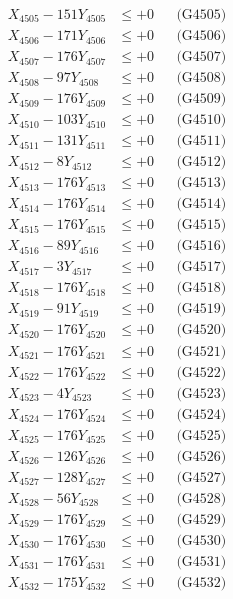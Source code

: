 \documentclass[a4paper,10pt]{article}
\begin{document}
{\begin{align}
X_{4505} - 151Y_{4505} &\leq +0 && \text{(G4505)} \\
X_{4506} - 171Y_{4506} &\leq +0 && \text{(G4506)} \\
X_{4507} - 176Y_{4507} &\leq +0 && \text{(G4507)} \\
X_{4508} - 97Y_{4508} &\leq +0 && \text{(G4508)} \\
X_{4509} - 176Y_{4509} &\leq +0 && \text{(G4509)} \\
X_{4510} - 103Y_{4510} &\leq +0 && \text{(G4510)} \\
\allowbreak
X_{4511} - 131Y_{4511} &\leq +0 && \text{(G4511)} \\
X_{4512} - 8Y_{4512} &\leq +0 && \text{(G4512)} \\
X_{4513} - 176Y_{4513} &\leq +0 && \text{(G4513)} \\
X_{4514} - 176Y_{4514} &\leq +0 && \text{(G4514)} \\
X_{4515} - 176Y_{4515} &\leq +0 && \text{(G4515)} \\
X_{4516} - 89Y_{4516} &\leq +0 && \text{(G4516)} \\
X_{4517} - 3Y_{4517} &\leq +0 && \text{(G4517)} \\
X_{4518} - 176Y_{4518} &\leq +0 && \text{(G4518)} \\
X_{4519} - 91Y_{4519} &\leq +0 && \text{(G4519)} \\
X_{4520} - 176Y_{4520} &\leq +0 && \text{(G4520)} \\
\allowbreak
X_{4521} - 176Y_{4521} &\leq +0 && \text{(G4521)} \\
X_{4522} - 176Y_{4522} &\leq +0 && \text{(G4522)} \\
X_{4523} - 4Y_{4523} &\leq +0 && \text{(G4523)} \\
X_{4524} - 176Y_{4524} &\leq +0 && \text{(G4524)} \\
X_{4525} - 176Y_{4525} &\leq +0 && \text{(G4525)} \\
X_{4526} - 126Y_{4526} &\leq +0 && \text{(G4526)} \\
X_{4527} - 128Y_{4527} &\leq +0 && \text{(G4527)} \\
X_{4528} - 56Y_{4528} &\leq +0 && \text{(G4528)} \\
X_{4529} - 176Y_{4529} &\leq +0 && \text{(G4529)} \\
X_{4530} - 176Y_{4530} &\leq +0 && \text{(G4530)} \\
\allowbreak
X_{4531} - 176Y_{4531} &\leq +0 && \text{(G4531)} \\
X_{4532} - 175Y_{4532} &\leq +0 && \text{(G4532)} \\

\end{align}}
\end{document}
